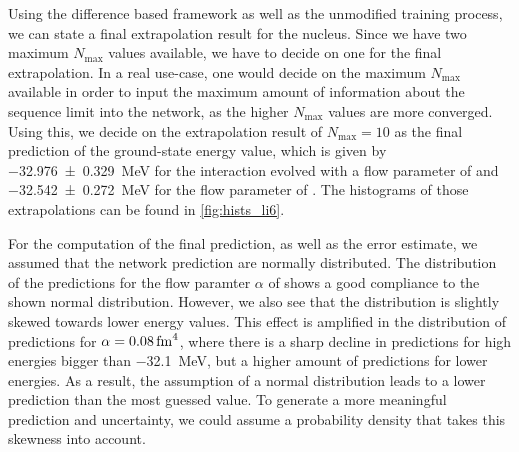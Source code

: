 Using the difference based framework as well as the unmodified training process, we can state a final extrapolation result for the  nucleus. Since we have two maximum $N_\mathrm{max}$ values available, we have to decide on one for the final extrapolation. In a real use-case, one would decide on the maximum $N_\mathrm{max}$ available in order to input the maximum amount of information about the sequence limit into the network, as the higher $N_\mathrm{max}$ values are more converged. Using this, we decide on the extrapolation result of $N_\mathrm{max} = 10$ as the final prediction of the  ground-state energy value, which is given by \SI{-32.976 \pm 0.329}{\mega\electronvolt} for the interaction evolved with a flow parameter of  and \SI{-32.542 \pm 0.272}{\mega\electronvolt} for the flow parameter of . The histograms of those extrapolations can be found in \autoref{fig:hists_li6}.

For the computation of the final prediction, as well as the error estimate, we assumed that the network prediction are normally distributed. The distribution of the predictions for the flow paramter $\alpha$ of  shows a good compliance to the shown normal distribution. However, we also see that the distribution is slightly skewed towards lower energy values. This effect is amplified in the distribution of predictions for $\alpha = \srg{0.08}$, where there is a sharp decline in predictions for high energies bigger than \SI{-32.1}{\mega\electronvolt}, but a higher amount of predictions for lower energies. As a result, the assumption of a normal distribution leads to a lower prediction than the most guessed value. To generate a more meaningful prediction and uncertainty, we could assume a probability density that takes this skewness into account.

